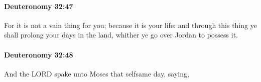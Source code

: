 		\paragraph{Deuteronomy 32:47} %
			\label{DEUTERONOMY-32-47}

			For it is not a vain thing for you; because it is your life: and through this thing ye shall prolong your days in the land, whither ye go over Jordan to possess it.


		\paragraph{Deuteronomy 32:48} %
			\label{DEUTERONOMY-32-48}

			And the LORD spake unto Moses that selfsame day, saying,


